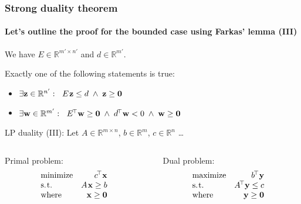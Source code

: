 \documentclass{beamer}
\renewcommand{\.}{\hskip .75pt}
\DeclareMathOperator{\aand}{~\wedge~}
\begin{document}
\begin{frame}
	\frametitle{Strong duality theorem}
	\framesubtitle{Let's outline the proof for the bounded case using Farkas' lemma (III)}
	
	We have $E \in \mathbb{R}^{m' \times n'}$ and $d \in \mathbb{R}^{m'}$.
	\smallskip

	Exactly one of the following statements is true:
	\begin{itemize} \color{dblue}
		\item $\exists \bold{z} \in \mathbb{R}^{n'} : \ \; E\. \bold{z} \le d \aand \bold{z} \ge \bold{0}$
		\item $\exists \bold{w} \in \mathbb{R}^{m'} : \ \; E^{\!\top} \bold{w} \ge \bold{0} \aand d^{\!\top} \bold{w} < 0 \aand \bold{w} \ge \bold{0}$
	\end{itemize}
	\bigskip

	LP duality (III): Let $A \in \mathbb{R}^{m \times n}$, $b \in \mathbb{R}^{m}$, $c \in \mathbb{R}^{n}$ \dots
	\bigskip

	\begin{columns} 
		\begin{column}{0.5\textwidth}
		\qquad 
		Primal problem:
		$$
		\begin{array}{lrcrcl}
			\text{minimize} & c^{\!\top}\bold{x} \\
			\text{s.\.t.} & A\. \bold{x} \ge b \\
			\text{where} & \bold{x} \ge \bold{0}
		\end{array}
		$$
		\end{column}
		
		\begin{column}{0.5\textwidth}
		\quad~
		Dual problem:
		$$
		\begin{array}{lrcrcl}
			\text{maximize} & b^{\!\top}\bold{y} \\
			\text{s.\.t.} & A^{\!\top} \bold{y} \le c \\
			\text{where} & \bold{y} \ge \bold{0}
		\end{array}
		$$
		\end{column}
	\end{columns}
	
\end{frame}
\end{document}
